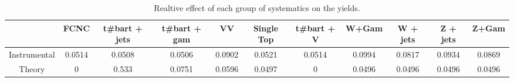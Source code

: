 \begin{table}[htbp]
\begin{center}
\begin{tabular}{|c|c|c|c|c|c|c|c|c|c|c|}
\hline 
      & FCNC      & t#bar{t} + jets      & t#bar{t} +  gam      & VV      & Single Top      & t#bar{t} + V      & W+Gam      & W + jets      & Z + jets      & Z+Gam \\ 
\hline 
 Instrumental & 0.0514 & 0.0508 & 0.0506 & 0.0902 & 0.0521 & 0.0514 & 0.0994 & 0.0817 & 0.0934 & 0.0869 \\ 
 Theory & 0 & 0.533 & 0.0751 & 0.0596 & 0.0497 & 0 & 0.0496 & 0.0496 & 0.0496 & 0.0496 \\ 
\hline 
\end{tabular} 
\caption{Realtive effect of each group of systematics on the yields.} 
\end{center} 
\end{table} 
